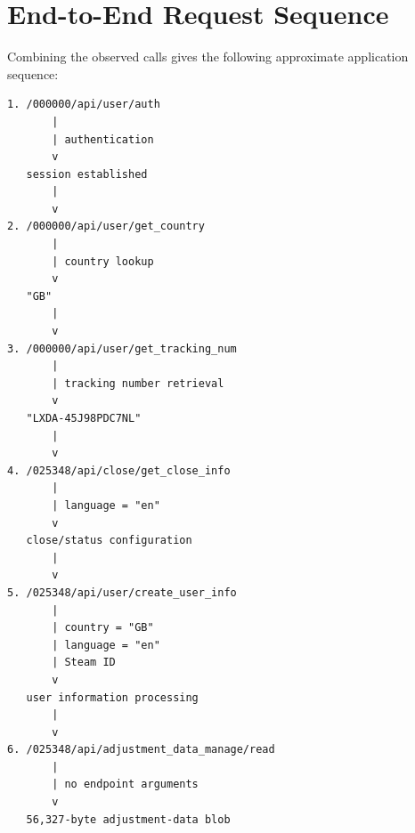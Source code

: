 \documentclass[11pt,a4paper]{article}
\begin{document}
































\section{End-to-End Request Sequence}

Combining the observed calls gives the following approximate application
sequence:

\begin{lstlisting}
1. /000000/api/user/auth
       |
       | authentication
       v
   session established
       |
       v
2. /000000/api/user/get_country
       |
       | country lookup
       v
   "GB"
       |
       v
3. /000000/api/user/get_tracking_num
       |
       | tracking number retrieval
       v
   "LXDA-45J98PDC7NL"
       |
       v
4. /025348/api/close/get_close_info
       |
       | language = "en"
       v
   close/status configuration
       |
       v
5. /025348/api/user/create_user_info
       |
       | country = "GB"
       | language = "en"
       | Steam ID
       v
   user information processing
       |
       v
6. /025348/api/adjustment_data_manage/read
       |
       | no endpoint arguments
       v
   56,327-byte adjustment-data blob
\end{lstlisting}
\end{document}
